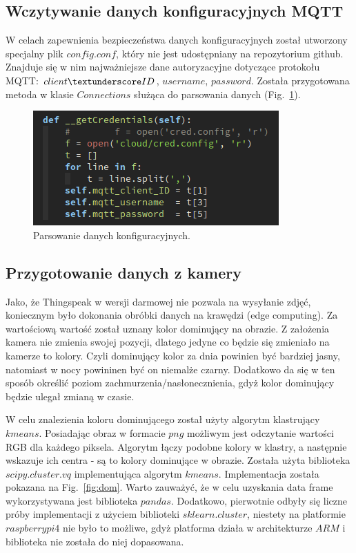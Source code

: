 \documentclass{article}
\begin{document}
\subsection{Wczytywanie danych konfiguracyjnych MQTT}
W celach zapewnienia bezpieczeństwa danych konfiguracyjnych został utworzony specjalny plik $config.conf$, który nie jest udostępniany na repozytorium github. Znajduje się w nim najważniejsze dane autoryzacyjne dotyczące protokołu MQTT: $client\textunderscore ID$, $username$, $password$. Została przygotowana metoda w klasie $Connections$ służąca do parsowania danych (Fig.~\ref{fig:conf}).
  \begin{figure}
  \centering
  \includegraphics[scale = 1]{get_credentials.png}
  \caption{Parsowanie danych konfiguracyjnych.} \label{fig:conf}    
\end{figure}

\subsection{Przygotowanie danych z kamery}
Jako, że Thingspeak w wersji darmowej nie pozwala na wysyłanie zdjęć, koniecznym było dokonania obróbki danych na krawędzi (edge computing). Za wartościową wartość został uznany kolor dominujący na obrazie. Z założenia kamera nie zmienia swojej pozycji, dlatego jedyne co będzie się zmieniało na kamerze to kolory. Czyli dominujący kolor za dnia powinien być bardziej jasny, natomiast w nocy powininen być on niemalże czarny. Dodatkowo da się w ten sposób określić poziom zachmurzenia/nasłonecznienia, gdyż kolor dominujący będzie ulegał zmianą w czasie.

W celu znalezienia koloru dominującego został użyty algorytm klastrujący $kmeans$. Posiadając obraz w formacie $png$ możliwym jest odczytanie wartości RGB dla każdego piksela. Algorytm łączy podobne kolory w klastry, a następnie wskazuje ich centra - są to kolory dominujące w obrazie. Została użyta biblioteka $scipy.cluster.vq$ implementująca algorytm $kmeans$. Implementacja została pokazana na Fig.~\ref{fig:dom}. Warto zauważyć, że w celu uzyskania data frame wykorzystywana jest biblioteka $pandas$. Dodatkowo, pierwotnie odbyły się liczne próby implementacji z użyciem biblioteki $sklearn.cluster$, niestety na platformie $raspberry pi 4$ nie było to możliwe, gdyż platforma działa w architekturze $ARM$ i biblioteka nie została do niej dopasowana.
\end{document}
